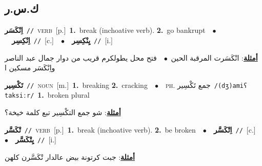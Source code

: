 \documentclass[10pt,a4paper,twoside]{article} %
\begin{document}
\begin{multicols}{2}
\vspace{-3mm}
\subsection*{\color{blue}\foreignlanguage{arabic}{ك.س.ر}\color{blue}{}} 

{\setlength\topsep{0pt}\textbf{\foreignlanguage{arabic}{اِنْكَسَر}}\ {\color{gray}\texttt{//}\color{black}}\ \textsc{verb}\ [p.]\ \textbf{1.}~break (inchoative verb).  \textbf{2.}~go bankrupt\ \ $\bullet$\ \ \setlength\topsep{0pt}\textbf{\foreignlanguage{arabic}{اِنْكِسِر}}\ {\color{gray}\texttt{//}\color{black}}\ [c.]\ \ $\bullet$\ \ \setlength\topsep{0pt}\textbf{\foreignlanguage{arabic}{يِنْكِسِر}}\ {\color{gray}\texttt{//}\color{black}}\ [i.]\  \begin{flushright}\color{gray}\foreignlanguage{arabic}{\textbf{\underline{\foreignlanguage{arabic}{أمثلة}}}: انْكَسَرت المرقبة الحين\ $\bullet$\ \  فتح محل يطولكرم قريب من دوار جمال عبد الناصر واِنْكَسَر مسكين ا}\end{flushright}\color{black}} \vspace{2mm}

{\setlength\topsep{0pt}\textbf{\foreignlanguage{arabic}{تَكْسِير}}\ {\color{gray}\texttt{//}\color{black}}\ \textsc{noun}\ [m.]\ \textbf{1.}~breaking  \textbf{2.}~cracking\ \ $\bullet$\ \ \textsc{ph.} \color{gray} \foreignlanguage{arabic}{جمع تَكْسِير}\color{black}\ {\color{gray}\texttt{/{\sffamily (dʒ)amiʕ taksiːr}/}\color{black}}\ \textbf{1.}~broken plural\  \begin{flushright}\color{gray}\foreignlanguage{arabic}{\textbf{\underline{\foreignlanguage{arabic}{أمثلة}}}: شو جمع التكْسِير تبع كلمة خيخة؟}\end{flushright}\color{black}} \vspace{2mm}

{\setlength\topsep{0pt}\textbf{\foreignlanguage{arabic}{تْكَسَّر}}\ {\color{gray}\texttt{//}\color{black}}\ \textsc{verb}\ [p.]\ \textbf{1.}~break (inchoative verb).  \textbf{2.}~be broken\ \ $\bullet$\ \ \setlength\topsep{0pt}\textbf{\foreignlanguage{arabic}{اِتْكَسَّر}}\ {\color{gray}\texttt{//}\color{black}}\ [c.]\ \ $\bullet$\ \ \setlength\topsep{0pt}\textbf{\foreignlanguage{arabic}{يِتْكَسَّر}}\ {\color{gray}\texttt{//}\color{black}}\ [i.]\  \begin{flushright}\color{gray}\foreignlanguage{arabic}{\textbf{\underline{\foreignlanguage{arabic}{أمثلة}}}: جبت كرتونة بيض عالدار تْكَسَّرن كلهن}\end{flushright}\color{black}} \vspace{2mm}


\end{multicols}
\end{document}
